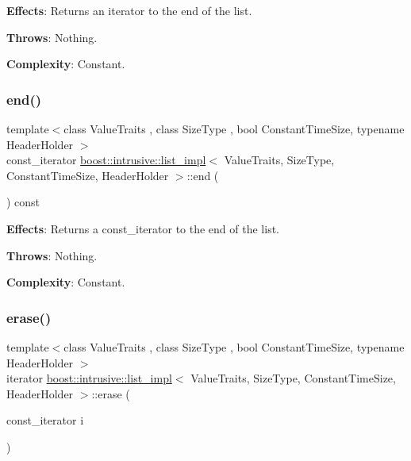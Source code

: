{\bfseries Effects}\+: Returns an iterator to the end of the list.

{\bfseries Throws}\+: Nothing.

{\bfseries Complexity}\+: Constant. \mbox{\label{classboost_1_1intrusive_1_1list__impl_a797bd19e3f14f42d556bb85de2fc1ac3}} 
\subsubsection{\texorpdfstring{end()}{end()}\hspace{0.1cm}{\footnotesize\ttfamily [2/2]}}
{\footnotesize\ttfamily template$<$class Value\+Traits , class Size\+Type , bool Constant\+Time\+Size, typename Header\+Holder $>$ \\
const\+\_\+iterator \hyperlink{classboost_1_1intrusive_1_1list__impl}{boost\+::intrusive\+::list\+\_\+impl}$<$ Value\+Traits, Size\+Type, Constant\+Time\+Size, Header\+Holder $>$\+::end (\begin{DoxyParamCaption}{ }\end{DoxyParamCaption}) const\hspace{0.3cm}{\ttfamily [inline]}}

{\bfseries Effects}\+: Returns a const\+\_\+iterator to the end of the list.

{\bfseries Throws}\+: Nothing.

{\bfseries Complexity}\+: Constant. \mbox{\label{classboost_1_1intrusive_1_1list__impl_a5b8579de073832e53c545fe5cca65057}} 
\subsubsection{\texorpdfstring{erase()}{erase()}\hspace{0.1cm}{\footnotesize\ttfamily [1/3]}}
{\footnotesize\ttfamily template$<$class Value\+Traits , class Size\+Type , bool Constant\+Time\+Size, typename Header\+Holder $>$ \\
iterator \hyperlink{classboost_1_1intrusive_1_1list__impl}{boost\+::intrusive\+::list\+\_\+impl}$<$ Value\+Traits, Size\+Type, Constant\+Time\+Size, Header\+Holder $>$\+::erase (\begin{DoxyParamCaption}\item[{const\+\_\+iterator}]{i }\end{DoxyParamCaption})\hspace{0.3cm}{\ttfamily [inline]}}

